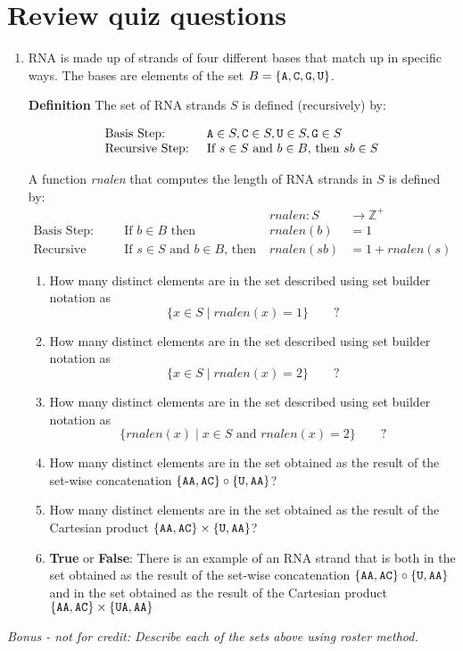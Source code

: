 \documentclass[12pt, oneside]{article}
\begin{document}
\section*{Review quiz questions}
\begin{enumerate}
\item RNA is made up of strands of four different bases that match up in
specific ways. The bases are elements of the set 
$B  = \{\texttt{A}, \texttt{C}, \texttt{G}, \texttt{U} \}$.

{\bf Definition} The set of RNA strands $S$ is defined (recursively) by:

\[
\begin{array}{ll}
\textrm{Basis Step: } & \texttt{A} \in S, \texttt{C} \in S, \texttt{U} \in S, \texttt{G} \in S \\
\textrm{Recursive Step: } & \textrm{If } s \in S\textrm{ and }b \in B \textrm{, then }sb \in S
\end{array}
\]

A function \textit{rnalen} that computes the length of RNA strands in $S$ is defined by:
\[
\begin{array}{llll}
& & \textit{rnalen} : S & \to \mathbb{Z}^+ \\
\textrm{Basis Step:} & \textrm{If } b \in B\textrm{ then } & \textit{rnalen}(b) & = 1 \\
\textrm{Recursive Step:} & \textrm{If } s \in S\textrm{ and }b \in B\textrm{, then  } & \textit{rnalen}(sb) & = 1 + \textit{rnalen}(s)
\end{array}
\]

\begin{enumerate}
\item How many distinct elements are in the set described using set builder notation as 
\[
\{ x \in S \mid rnalen(x) = 1\} \qquad ?
\]

\item How many distinct elements are in the set described using set builder notation as 
\[
\{ x \in S \mid rnalen(x) = 2\} \qquad ?
\]

\item How many distinct elements are in the set described using set builder notation as 
\[
\{ rnalen(x) \mid x \in S \text{ and } rnalen(x) = 2\} \qquad ?
\]


\item How many distinct elements are in the set obtained as the result
of the set-wise concatenation $\{ \texttt{A}\texttt{A}, \texttt{A}\texttt{C} \} \circ \{\texttt{U}, \texttt{A}\texttt{A} \}$?

\item How many distinct elements are in the set obtained as the result
of the Cartesian product $\{ \texttt{A}\texttt{A}, \texttt{A}\texttt{C} \} \times \{\texttt{U}, \texttt{A}\texttt{A} \}$?

\item {\bf True} or {\bf False}: There is an example of an RNA strand that is both in the set obtained as the result
of the set-wise concatenation $\{ \texttt{A}\texttt{A}, \texttt{A}\texttt{C} \} \circ \{\texttt{U}, \texttt{A}\texttt{A} \}$ and in the set obtained as the result of the 
Cartesian product $\{ \texttt{A}\texttt{A}, \texttt{A}\texttt{C} \} \times \{\texttt{U}\texttt{A}, \texttt{A}\texttt{A} \}$

\end{enumerate}
\end{enumerate}
{\it Bonus - not for credit: Describe each of the sets above using roster method.}
\newpage
\end{document}
